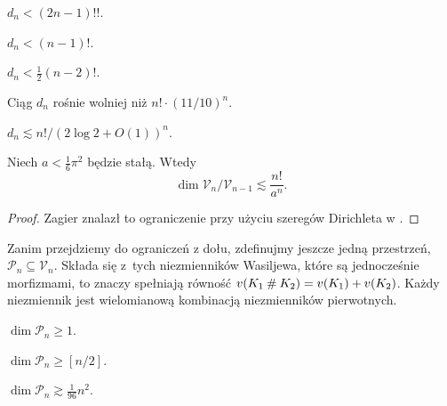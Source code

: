 \begin{proposition}
    $d_n < (2n-1)!!$.
\end{proposition}

\begin{proposition}
    $d_n < (n-1)!$.
\end{proposition}

\begin{proposition}[Ng, 1995]
    $d_n < \frac 12 (n-2)!$.
\end{proposition}

\begin{proposition}[Stojmenow, 1996]
    Ciąg $d_n$ rośnie wolniej niż $n! \cdot (11/10)^n$.
\end{proposition}

\begin{proposition}
    $d_n \lesssim n! / (2 \log 2 + O(1))^n$.
\end{proposition}

\begin{proposition}[Zagier, 2001]
    Niech $a < \frac 1 6 \pi^2$ będzie stałą.
    Wtedy
    \begin{equation}
        \dim \mathcal V_n / \mathcal V_{n-1} \lesssim \frac{n!}{a^n}.
    \end{equation}
\end{proposition}

\begin{proof}
    Zagier znalazł to ograniczenie przy użyciu szeregów Dirichleta w \cite{zagier01}.
\end{proof}

Zanim przejdziemy do ograniczeń z dołu, zdefinujmy jeszcze jedną przestrzeń, $\mathcal P_n \subseteq \mathcal V_n$.
Składa się z~tych niezmienników Wasiljewa, które są jednocześnie morfizmami, to znaczy spełniają równość $v(K_1 \mathbin{\#} K_2) = v(K_1) + v(K_2)$.
Każdy niezmiennik jest wielomianową kombinacją niezmienników pierwotnych.

\begin{proposition}
    $\dim \mathcal P_n \ge 1$.
\end{proposition}

\begin{proposition}
    $\dim \mathcal P_n \ge [n/2]$.
\end{proposition}

\begin{proposition}[Duzhin, 1996]
    $\dim \mathcal P_n \gtrsim \frac{1}{96} n^2$.
\end{proposition}

